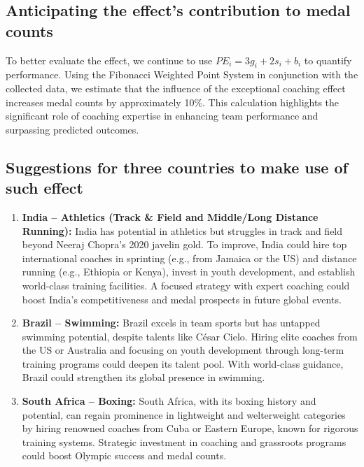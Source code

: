 \documentclass[12pt]{article}  %
\begin{document}
\subsection{Anticipating the effect's contribution to medal counts}

To better evaluate the effect, we continue to use $PE_i=3g_i+2s_i+b_i$ to quantify performance\cite{3}. Using the Fibonacci Weighted Point System in conjunction with the collected data, we estimate that the influence of the exceptional coaching effect increases medal counts by approximately 10\%. This calculation highlights the significant role of coaching expertise in enhancing team performance and surpassing predicted outcomes.
\subsection{Suggestions for three countries to make use of such effect}


\begin{enumerate}[\textbullet]
    \item \textbf{India – Athletics (Track & Field and Middle/Long Distance Running):}
    India has potential in athletics but struggles in track and field beyond Neeraj Chopra's 2020 javelin gold. To improve, India could hire top international coaches in sprinting (e.g., from Jamaica or the US) and distance running (e.g., Ethiopia or Kenya), invest in youth development, and establish world-class training facilities. A focused strategy with expert coaching could boost India's competitiveness and medal prospects in future global events.

    \item \textbf{Brazil – Swimming:}
    Brazil excels in team sports but has untapped swimming potential, despite talents like César Cielo. Hiring elite coaches from the US or Australia and focusing on youth development through long-term training programs could deepen its talent pool. With world-class guidance, Brazil could strengthen its global presence in swimming.

    \item \textbf{South Africa – Boxing:}
   South Africa, with its boxing history and potential, can regain prominence in lightweight and welterweight categories by hiring renowned coaches from Cuba or Eastern Europe, known for rigorous training systems. Strategic investment in coaching and grassroots programs could boost Olympic success and medal counts.
\end{enumerate}
\end{document}
